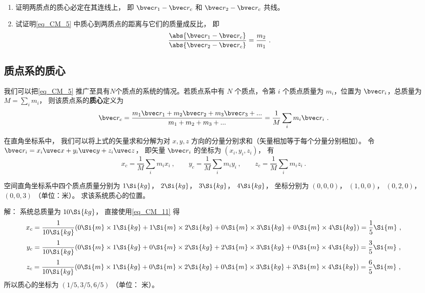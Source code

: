 \begin{exercise}{}
\begin{enumerate}
\item 证明两质点的质心必定在其连线上， 即 $\bvec r_1 - \bvec r_c$ 和 $\bvec r_2 - \bvec r_c$ 共线。%
\item 试证明\autoref{eq_CM_5} 中质心到两质点的距离与它们的质量成反比， 即
\begin{equation}\label{eq_CM_6}
\frac{\abs{\bvec r_1 - \bvec r_c}}{\abs{\bvec r_2 - \bvec r_c}} = \frac{m_2}{m_1}~.
\end{equation}
\end{enumerate}
\end{exercise}

\subsection{质点系的质心}
我们可以把\autoref{eq_CM_5} 推广至具有$N$个质点的系统的情况。若质点系中有 $N$ 个质点，令第 $i$ 个质点质量为 $m_i$，位置为 $\bvec r_i$，总质量为 $M = \sum\limits_i m_i$， 则该质点系的\textbf{质心}定义为
\begin{equation}\label{eq_CM_1}
\bvec r_c = \frac{m_1 \bvec r_1 + m_2 \bvec r_2 + m_3 \bvec r_3 +... }{m_1 + m_2 +m_3+...}=\frac{1}{M}\sum_i m_i \bvec r_i~.
\end{equation}

在直角坐标系中， 我们可以将上式的矢量求和分解为对 $x, y, z$ 方向的分量分别求和（矢量相加等于每个分量分别相加）。 令 $\bvec r_i = x_i \uvec x + y_i \uvec y + z_i \uvec z$， 即矢量 $\bvec r_i$ 的坐标为 $(x_i, y_i, z_i)$， 有
\begin{equation}\label{eq_CM_11}
x_c = \frac{1}{M}\sum_i m_i x_i ~,\qquad
y_c = \frac{1}{M}\sum_i m_i y_i ~,\qquad
z_c = \frac{1}{M}\sum_i m_i z_i~.
\end{equation}

\begin{example}{}
空间直角坐标系中四个质点质量分别为 $1 \Si{kg}$， $2 \Si{kg}$， $3 \Si{kg}$， $4 \Si{kg}$， 坐标分别为 $(0, 0, 0)$， $(1, 0, 0)$， $(0, 2, 0)$， $(0, 0, 3)$ （单位：米）。 求该系统质心的位置。

解： 系统总质量为 $10 \Si{kg}$， 直接使用\autoref{eq_CM_11} 得
\begin{equation}
x_c = \frac{1}{10 \Si{kg}} (0 \Si{m} \times 1 \Si{kg} + 1 \Si{m}\times 2 \Si{kg} + 0\Si{m} \times 3 \Si{kg} + 0 \Si{m}\times 4 \Si{kg}) = \frac15 \Si{m}~,
\end{equation}
\begin{equation}
y_c = \frac{1}{10 \Si{kg}} (0\Si{m}\times 1 \Si{kg} + 0\Si{m} \times 2 \Si{kg} + 2\Si{m} \times 3 \Si{kg} + 0 \Si{m}\times 4 \Si{kg}) = \frac35 \Si{m}~,
\end{equation}
\begin{equation}
z_c = \frac{1}{10 \Si{kg}} (0\Si{m}\times 1 \Si{kg} + 0\Si{m} \times 2 \Si{kg} + 0\Si{m} \times 3 \Si{kg} + 3 \Si{m}\times 4 \Si{kg}) = \frac65 \Si{m}~,
\end{equation}
所以质心的坐标为 $(1/5, 3/5, 6/5)$ （单位： 米）。
\end{example}

